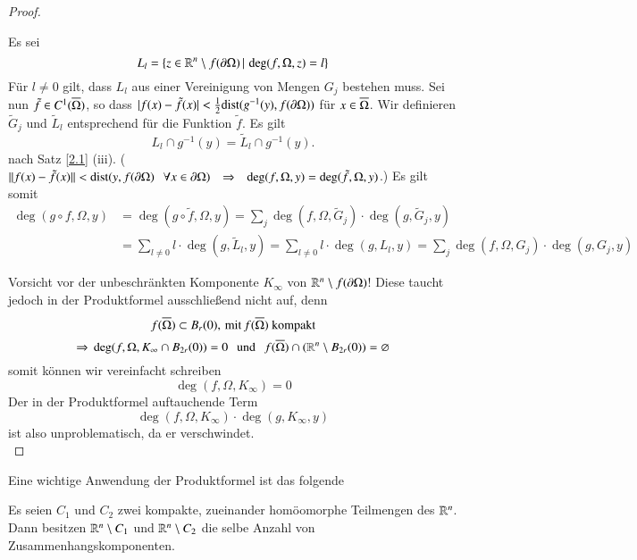 \begin{proof}
\begin{description}
    Es sei
    \[
        L_l=\{z\in \mathbb{R}^n\setminus f(\partial \Omega)\, | \, \deg(f,\Omega,z)=l\}
    \]
    Für $l\neq 0$ gilt, dass $L_l$ aus einer Vereinigung von Mengen $G_j$ bestehen muss. Sei nun
    $\tilde f\in C^1 (\overline \Omega)$, so dass $|f(x)-\tilde f(x)|< \frac 12 \mathrm{dist}(g^{-1}(y),
    f(\partial\Omega))$ für $x\in \overline \Omega$. Wir definieren $\tilde G_j$ und $\tilde L_l$ entsprechend
    für die Funktion $\tilde f$.
    Es gilt
    \[
        L_l\cap g^{-1}(y)=\tilde L_l\cap g^{-1}(y).
    \]
    nach Satz \ref{2.1} (iii). ($\|f(x)-\tilde f(x)\|<\mathrm{dist}(y,f(\partial \Omega)\hspace{.25cm} \forall
    x\in \partial \Omega)\hspace{.25cm} \Rightarrow \hspace{.25cm} \deg(f,\Omega,y)=\deg(\tilde f,\Omega,y)$.) Es gilt somit
    \begin{align*}
        \deg(g\circ f, \Omega, y)&=\deg(g\circ\tilde f,\Omega,y)
            =\sum_{j}\deg(f,\Omega,\tilde G_j)\cdot \deg(g,\tilde G_j,y)\\
        &=\sum_{l\neq0} l\cdot\deg( g,\tilde L_l,y)=\sum_{l\neq 0} l\cdot \deg(g,L_l,y)
        =\sum_j \deg(f,\Omega,G_j)\cdot \deg(g,G_j,y)
    \end{align*}
    \end{description}
    Vorsicht vor der unbeschränkten Komponente $K_\infty$ von $\mathbb{R}^n\setminus f(\partial
    \Omega)$! Diese taucht jedoch in der Produktformel ausschließend nicht auf, denn
    \[
        f(\overline \Omega)\subset B_r(0), \, \text{mit}\, f(\overline \Omega) \text{ kompakt}
    \]
    \[
        \Rightarrow \, \deg(f,\Omega,K_\infty\cap B_{2r}(0))=0 \hspace{.25cm} \text{und} \hspace{.25cm} f(\overline \Omega)
        \cap (\mathbb{R}^n\setminus B_{2r}(0))=\varnothing
    \]
    somit können wir vereinfacht schreiben
    \[
        \deg(f,\Omega,K_\infty)=0
    \]
    Der in der Produktformel auftauchende Term
    \[
        \deg(f,\Omega,K_\infty)\cdot \deg(g,K_\infty,y)
    \]
    ist also unproblematisch, da er verschwindet.\[ \]
\end{proof}

Eine wichtige Anwendung der Produktformel ist das folgende
\begin{theorem}\label{2.16}
Es seien $C_1$ und $C_2$ zwei kompakte, zueinander homöomorphe Teilmengen des $\mathbb{R}^n$. Dann besitzen
$\mathbb{R}^n\setminus C_1$ und $\mathbb{R}^n\setminus C_2$ die selbe Anzahl von Zusammenhangskomponenten.
\end{theorem}
